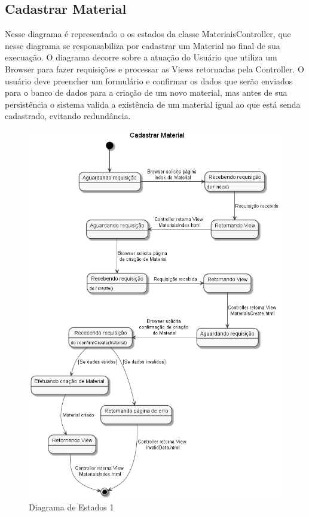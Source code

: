 \documentclass[rascunho,xindy,acronym,symbols]{fei}
\begin{document}
\subsection{Cadastrar Material}

Nesse diagrama é representado o os estados da classe MateriaisController, que nesse diagrama se responsabiliza por cadastrar um Material no final de sua execuação. O diagrama decorre sobre a atuação do Usuário que utiliza um Browser para fazer requisições e processar as Views retornadas pela Controller. O usuário deve preencher um formulário e confirmar os dados que serão enviados para o banco de dados para a criação de um novo material, mas antes de sua persistência o sistema valida a existência de um material igual ao que está senda cadastrado, evitando redundância.


\begin{figure}[H]
    \centering
    \includegraphics[scale=0.6, width=400pt]{./Images/DE_-_Cadastrar_Material.png}
    \caption{Diagrama de Estados 1}
    \label{fig:diag_est1}
\end{figure}
\end{document}
